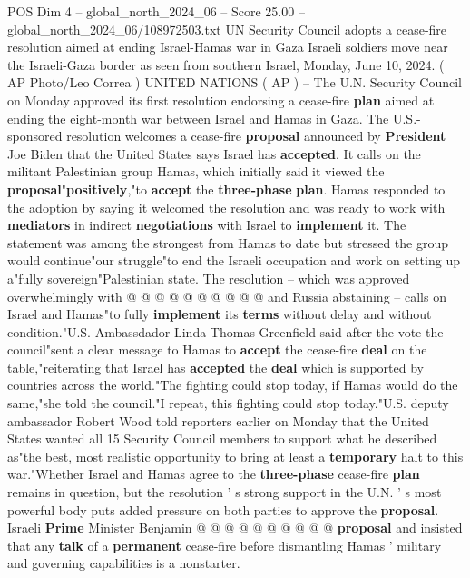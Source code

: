 \begin{textsample}{POS Dim 4 – global\_north\_2024\_06 – Score 25.00 – global\_north\_2024\_06/108972503.txt}  \label{ex:f4_pos_146}
UN Security Council adopts a cease-fire resolution aimed at ending Israel-Hamas war in Gaza Israeli soldiers move near the Israeli-Gaza border as seen from southern Israel, Monday, June 10, 2024. ( AP Photo/Leo Correa ) UNITED NATIONS ( AP ) -- The U.N.
Security Council on Monday approved its first resolution endorsing a cease-fire \textbf{plan} aimed at ending the eight-month war between Israel and Hamas in Gaza.
The U.S.-sponsored resolution welcomes a cease-fire \textbf{proposal} announced by \textbf{President} Joe Biden that the United States says Israel has \textbf{accepted}.
It calls on the militant Palestinian group Hamas, which initially said it viewed the \textbf{proposal}"\textbf{positively},"to \textbf{accept} the \textbf{three-phase} \textbf{plan}.
Hamas responded to the adoption by saying it welcomed the resolution and was ready to work with \textbf{mediators} in indirect \textbf{negotiations} with Israel to \textbf{implement} it.
The statement was among the strongest from Hamas to date but stressed the group would continue"our struggle"to end the Israeli occupation and work on setting up a"fully sovereign"Palestinian state.
The resolution -- which was approved overwhelmingly with @ @ @ @ @ @ @ @ @ @ and Russia abstaining -- calls on Israel and Hamas"to fully \textbf{implement} its \textbf{terms} without delay and without condition."U.S.
Ambassdador Linda Thomas-Greenfield said after the vote the council"sent a clear message to Hamas to \textbf{accept} the cease-fire \textbf{deal} on the table,"reiterating that Israel has \textbf{accepted} the \textbf{deal} which is supported by countries across the world."The fighting could stop today, if Hamas would do the same,"she told the council."I repeat, this fighting could stop today."U.S. deputy ambassador Robert Wood told reporters earlier on Monday that the United States wanted all 15 Security Council members to support what he described as"the best, most realistic opportunity to bring at least a \textbf{temporary} halt to this war."Whether Israel and Hamas agree to the \textbf{three-phase} cease-fire \textbf{plan} remains in question, but the resolution ' s strong support in the U.N. ' s most powerful body puts added pressure on both parties to approve the \textbf{proposal}.
Israeli \textbf{Prime} Minister Benjamin @ @ @ @ @ @ @ @ @ @ \textbf{proposal} and insisted that any \textbf{talk} of a \textbf{permanent} cease-fire before dismantling Hamas ' military and governing capabilities is a nonstarter.

\end{textsample}
